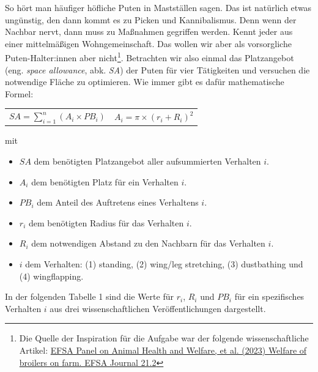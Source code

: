 \documentclass[a4paper, 9pt]{scrartcl}\usepackage[]{graphicx}\usepackage[]{xcolor}
\begin{document}
So h{\"o}rt man h{\"a}ufiger h{\"o}fliche Puten in Mastst{\"a}llen sagen. Das
ist nat{\"u}rlich etwas ung{\"u}nstig, den dann kommt es zu Picken und
Kannibalismus. Denn wenn der Nachbar nervt, dann muss zu Ma{\ss}nahmen
gegriffen werden. Kennt jeder aus einer mittelm{\"a}{\ss}igen Wohngemeinschaft. Das
wollen wir aber als vorsorgliche Puten-Halter:innen aber
nicht\footnote{Die Quelle der Inspiration f{\"u}r die Aufgabe war der folgende
  wissenschaftliche Artikel:
  \href{https://www.efsa.europa.eu/en/efsajournal/pub/7788}{EFSA Panel on
    Animal Health and Welfare, et al. (2023) Welfare of broilers on
    farm. EFSA Journal 21.2}}. Betrachten wir also einmal das Platzangebot
(eng. \textit{space allowance}, abk. \textit{SA}) der Puten
f{\"u}r vier T{\"a}tigkeiten und versuchen die notwendige Fl{\"a}che zu optimieren. Wie
immer gibt es daf{\"u}r mathematische Formel:


\begin{center}
  \begin{tabular}{cc}
    $SA = \sum^n_{i = 1} (A_i \times PB_i)$ & $A_i = \pi \times (r_i + R_i)^2$\\
  \end{tabular}
\end{center}

\vspace{-2Ex}

mit

\begin{itemize}[noitemsep]
\item $SA$ dem ben{\"o}tigten Platzangebot aller aufsummierten Verhalten $i$.
\item $A_i$ dem ben{\"o}tigten Platz f{\"u}r ein Verhalten $i$. 
\item $PB_i$ dem Anteil des Auftretens eines Verhaltens $i$.
\item $r_i$ dem ben{\"o}tigten Radius f{\"u}r das Verhalten $i$.
\item $R_i$ dem notwendigen Abstand zu den Nachbarn f{\"u}r das Verhalten $i$.    
\item $i$ dem Verhalten: (1) standing, (2) wing/leg stretching, (3)
  dustbathing und (4) wingflapping.
\end{itemize}

In der folgenden Tabelle 1 sind die Werte f{\"u}r $r_i$, $R_i$ und $PB_i$ f{\"u}r
ein spezifisches Verhalten $i$ aus drei wissenschaftlichen
Ver{\"o}ffentlichungen dargestellt.

\vspace{-1Ex}
\end{document}
